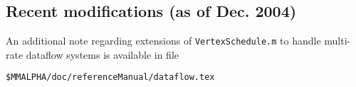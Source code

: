 % 
\subsection{Recent modifications (as of Dec. 2004)}
An additional note regarding extensions of 
\texttt{VertexSchedule.m} to handle multi-rate dataflow systems is
available in file
\begin{verbatim}
$MMALPHA/doc/referenceManual/dataflow.tex
\end{verbatim}
